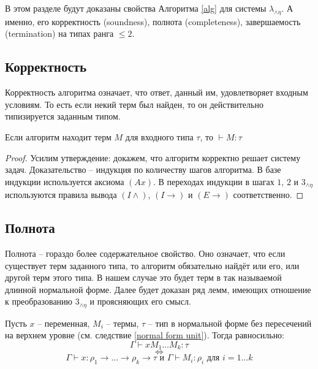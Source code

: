 \documentclass[../main.tex]{subfiles}
\begin{document}
 \label{sec:properties}



В этом разделе будут доказаны свойства Алгоритма \ref{alg} для системы $\lambda_{\wedge \eta}$. А именно, его корректность (soundness), полнота (completeness), завершаемость (termination) на типах ранга $\leqslant 2$.


\subsection{Корректность}

Корректность алгоритма означает, что ответ, данный им, удовлетворяет входным условиям. То есть если некий терм был найден, то он действительно типизируется заданным типом.

\begin{theorem}[Soundness] \label{soundness}
Если алгоритм находит терм $M$ для входного типа $\tau$, то $\vdash M \colon \tau$
\end{theorem}
\begin{proof}
Усилим утверждение: докажем, что алгоритм корректно решает систему задач. Доказательство -- индукция по количеству шагов алгоритма. В базе индукции используется аксиома $(Ax)$. В переходах индукции в шагах $1$, $2$ и $3_{\wedge \eta}$ используются правила вывода $(I \wedge)$, $(I \to)$ и $(E \to)$ соответственно.
\end{proof}

\subsection{Полнота}

Полнота -- гораздо более содержательное свойство. Оно означает, что если существует терм заданного типа, то алгоритм обязательно найдёт или его, или другой терм этого типа. В нашем случае это будет терм в так называемой длинной нормальной форме.
Далее будет доказан ряд лемм, имеющих отношение к преобразованию $3_{\wedge \eta}$ и проясняющих его смысл. 

\begin{lemma} \label{необходимая типизация}

Пусть $x$ -- переменная, $M_i$ -- термы, $\tau$ -- тип в нормальной форме без пересечений на верхнем уровне (см. следствие \ref{normal form unit}). Тогда равносильно: 
    $$\Gamma \vdash x M_1 \dots M_k \colon \tau$$ 
    $$\iff$$
    $$\Gamma \vdash x \colon \rho_1 \to \dots \to \rho_k \to \tau \text{ и } \Gamma \vdash M_i \colon \rho_i \text{ для } i = 1 \dots k$$
\end{lemma}
\end{document}
